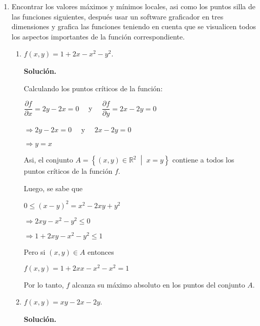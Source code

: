 \documentclass[fleqn, 12pt]{article}
\newcommand{\derivadaparcial}[2]{\dfrac{\partial {#1}}{\partial {#2}}}
\newcommand{\talque}{\; \middle | \;}
\begin{document}
    \begin{enumerate}
        \item Encontrar los valores máximos y mínimos locales, asi como los puntos silla de las funciones siguientes, después usar un software graficador en tres dimensiones y grafica las funciones teniendo en cuenta que se visualicen todos los aspectos importantes de la función correspondiente.
        
        \begin{enumerate}
            \item $ f(x,y) = 1 + 2x - x^2 - y^2 $.
            
            \textbf{Solución.}

            Calculando los puntos críticos de la función:

            $ \derivadaparcial{f}{x} = 2y - 2x = 0 \quad $ y $ \quad \derivadaparcial{f}{y} = 2x - 2y = 0 $

            $ \Longrightarrow 2y - 2x = 0 \quad $ y $ \quad 2x - 2y = 0 $

            $ \Longrightarrow y = x $

            Asi, el conjunto $ A = \left\lbrace (x,y) \in \mathbb{R}^2 \talque x = y \right\rbrace $ contiene a todos los puntos críticos de la función $ f $.

            Luego, se sabe que

            $ 0 \leq (x - y)^2 = x^2 - 2xy + y^2 $

            $ \Longrightarrow 2xy - x^2 - y^2 \leq 0 $

            $ \Longrightarrow 1 + 2xy - x^2 - y^2 \leq 1 $

            Pero si $ (x,y) \in A $ entonces

            $ f(x,y) = 1 + 2xx - x^2 - x^2 = 1 $

            Por lo tanto, $ f $ alcanza su máximo absoluto en los puntos del conjunto $ A $.

            \item $ f(x,y) = xy - 2x - 2y $.
            
            \textbf{Solución.}


\end{enumerate}
\end{enumerate}
\end{document}

